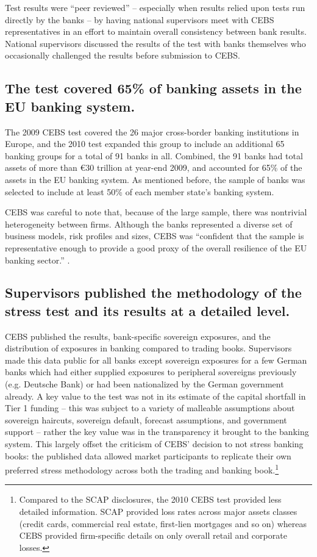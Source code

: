 \documentclass[12pt]{article}
\begin{document}
Test results were ``peer reviewed'' -- especially when results relied upon tests run directly by the banks -- by having national supervisors meet with CEBS representatives in an effort to maintain overall consistency between bank results. National supervisors discussed the results of the test with banks themselves who occasionally challenged the results before submission to CEBS. \citep{Methodology}

\subsection{The test covered 65\% of banking assets in the EU banking system.}

The 2009 CEBS test covered the 26 major cross-border banking institutions in Europe, and the 2010 test expanded this group to include an additional 65 banking groups for a total of 91 banks in all. Combined, the 91 banks had total assets of more than \euro{30} trillion at year-end 2009, and accounted for 65\% of the assets in the EU banking system. As mentioned before, the sample of banks was selected to include at least 50\% of each member state's banking system.

CEBS was careful to note that, because of the large sample, there was nontrivial heterogeneity between firms. Although the banks represented a diverse set of business models, risk profiles and sizes, CEBS was ``confident that the sample is representative enough to provide a good proxy of the overall resilience of the EU banking sector.'' \citep{Methodology}.

\subsection{Supervisors published the methodology of the stress test and its results at a detailed level.}

CEBS published the results, bank-specific sovereign exposures, and the distribution of exposures in banking compared to trading books. Supervisors made this data public for all banks except sovereign exposures for a few German banks which had either supplied exposures to peripheral sovereigns previously (e.g. Deutsche Bank) or had been nationalized by the German government already. A key value to the test was not in its estimate of the capital shortfall in Tier 1 funding -- this was subject to a variety of malleable assumptions about sovereign haircuts, sovereign default, forecast assumptions, and government support -- rather the key value was in the transparency it brought to the banking system. This largely offset the criticism of CEBS' decision to not stress banking books: the published data allowed market participants to replicate their own preferred stress methodology across both the trading and banking book.\footnote{Compared to the SCAP disclosures, the 2010 CEBS test provided less detailed information. SCAP provided loss rates across major assets classes (credit cards, commercial real estate, first-lien mortgages and so on) whereas CEBS provided firm-specific details on only overall retail and corporate losses.}
\end{document}
